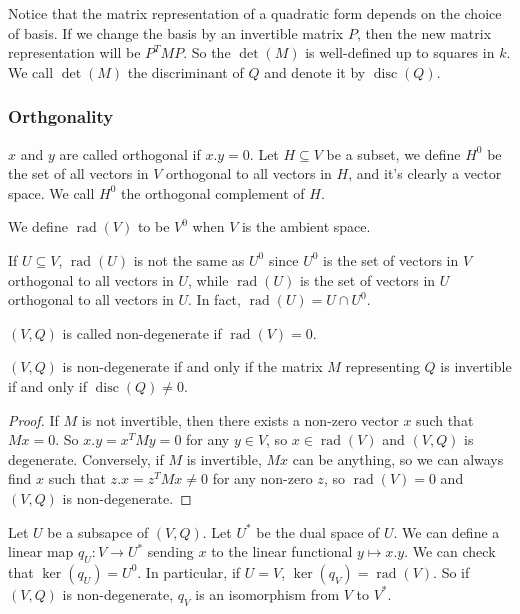 \documentclass[15pt]{scrartcl}
\newcommand{\disc}{\operatorname{disc}}
\newcommand{\rad}{\operatorname{rad}}
\begin{document}
Notice that the matrix representation of a quadratic form depends on the choice of basis. If we change the basis by an invertible matrix $P$, then the new matrix representation will be $P^TMP$. So the $\det(M)$ is well-defined up to squares in $k$. We call $\det(M)$ the discriminant of $Q$ and denote it by $\disc(Q)$.

\subsubsection*{Orthgonality}
\begin{definition}
    $x$ and $y$ are called orthogonal if $x.y=0$. Let $H\subseteq V$ be a subset, we define $H^0$ be the set of all vectors in $V$ orthogonal to all vectors in $H$, and it's clearly a vector space. We call $H^0$ the orthogonal complement of $H$.
\end{definition}
\begin{definition}
    We define $\rad(V)$ to be $V^0$ when $V$ is the ambient space. 
\end{definition}
\begin{remark}
    If $U\subseteq V$, $\rad(U)$ is not the same as $U^0$ since $U^0$ is the set of vectors in $V$ orthogonal to all vectors in $U$, while $\rad(U)$ is the set of vectors in $U$ orthogonal to all vectors in $U$. In fact, $\rad(U)=U\cap U^0$.
\end{remark}
\begin{definition}
    $(V, Q)$ is called non-degenerate if $\rad(V)=0$.
\end{definition}
\begin{lemma}
    $(V, Q)$ is non-degenerate if and only if the matrix $M$ representing $Q$ is invertible if and only if $\disc(Q)\neq 0$.
\end{lemma}
\begin{proof}
    If $M$ is not invertible, then there exists a non-zero vector $x$ such that $Mx=0$. So $x.y=x^T M y=0$ for any $y\in V$, so $x\in \rad(V)$ and $(V,Q)$ is degenerate. Conversely, if $M$ is invertible, $Mx$ can be anything, so we can always find $x$ such that $z.x=z^T M x\neq 0$ for any non-zero $z$, so $\rad(V)=0$ and $(V,Q)$ is non-degenerate. 
\end{proof}
Let $U$ be a subsapce of $(V,Q)$. Let $U^*$ be the dual space of $U$. We can define a linear map $q_U: V\to U^*$ sending $x$ to the linear functional $y\mapsto x.y$. We can check that $\ker(q_U)=U^0$. In particular, if $U=V$, $\ker(q_V)=\rad(V)$. So if $(V,Q)$ is non-degenerate, $q_V$ is an isomorphism from $V$ to $V^*$.
\end{document}
